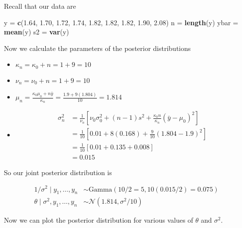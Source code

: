 \documentclass[]{article}
\newenvironment{Shaded}{\begin{snugshade}}{\end{snugshade}}
\newcommand{\FloatTok}[1]{\textcolor[rgb]{0.00,0.00,0.81}{#1}}
\newcommand{\KeywordTok}[1]{\textcolor[rgb]{0.13,0.29,0.53}{\textbf{#1}}}
\newcommand{\NormalTok}[1]{#1}
\newcommand{\StringTok}[1]{\textcolor[rgb]{0.31,0.60,0.02}{#1}}
\providecommand{\tightlist}{%
  \setlength{\itemsep}{0pt}\setlength{\parskip}{0pt}}
\begin{document}
Recall that our data are

\begin{Shaded}
\begin{Highlighting}[]
\NormalTok{y =}\StringTok{ }\KeywordTok{c}\NormalTok{(}\FloatTok{1.64}\NormalTok{, }\FloatTok{1.70}\NormalTok{, }\FloatTok{1.72}\NormalTok{, }\FloatTok{1.74}\NormalTok{, }\FloatTok{1.82}\NormalTok{, }\FloatTok{1.82}\NormalTok{, }\FloatTok{1.82}\NormalTok{, }\FloatTok{1.90}\NormalTok{, }\FloatTok{2.08}\NormalTok{)}
\NormalTok{n =}\StringTok{ }\KeywordTok{length}\NormalTok{(y)}
\NormalTok{ybar =}\StringTok{ }\KeywordTok{mean}\NormalTok{(y)}
\NormalTok{s2 =}\StringTok{ }\KeywordTok{var}\NormalTok{(y)}
\end{Highlighting}
\end{Shaded}

Now we calculate the parameters of the posterior distributions

\begin{itemize}
\tightlist
\item
  \(\kappa_n = \kappa_0 + n = 1 + 9 = 10\)
\item
  \(\nu_n = \nu_0 + n = 1 + 9 =10\)
\item
  \(\mu_n = \frac{\kappa_0 \mu_0 + n\bar{y}}{\kappa_n} = \frac{1.9 + 9(1.804)}{10} = 1.814\)
\item
  \begin{align}
  \sigma_n^2 &= \frac{1}{\nu_n} \left[ \nu_0 \sigma_0^2 + (n - 1)s^2 + \frac{\kappa_0 n}{\kappa_n} (\bar{y} - \mu_0)^2 \right] \\
  &= \frac{1}{10} \left[ 0.01 + 8(0.168) + \frac{9}{10} (1.804 - 1.9)^2 \right] \\
  &= \frac{1}{10} \left[ 0.01 + 0.135 + 0.008 \right] \\
  &= 0.015
  \end{align}
\end{itemize}

So our joint posterior distribution is

\begin{align}
1 / \sigma^2 \mid y_1, \dots, y_n &\sim \text{Gamma}(10/2 = 5, 10(0.015 / 2) = 0.075) \\
\theta \mid \sigma^2, y_1, \dots, y_n &\sim \mathcal{N}(1.814, \sigma^2 / 10)
\end{align}

Now we can plot the posterior distribution for various values of
\(\theta\) and \(\sigma^2\).
\end{document}
